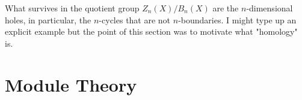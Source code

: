     \begin{note}
        What survives in the quotient group $Z_n(X)/B_n(X)$ are the $n$-dimensional holes, in particular, the $n$-cycles that are not $n$-boundaries. I might type up an explicit example but the point of this section was to motivate what "homology" is.
    \end{note}
\section{Module Theory}\label{sec:basic-mod-theory}
